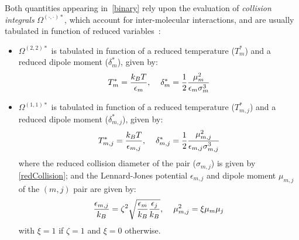 Both quantities appearing in~\ref{binary} rely upon the evaluation of \emph{collision integrals} $\Omega^{(\cdot,\cdot)*}$, which account for inter-molecular interactions, and are usually tabulated in function of reduced variables~\cite{Monchick:1961}:
\begin{itemize}
\item $\Omega^{(2,2)*}$ is tabulated in function of a reduced temperature ($T^*_m $) and a reduced dipole moment ($\delta^*_m$), given by:
\begin{eqnarray*}
T^*_m = \frac{k_BT}{\epsilon_m},
\hspace{4mm}
\delta^*_m = \frac{1}{2} \frac{\mu^2_m}{\epsilon_m \sigma^3_m}
\end{eqnarray*}
\item $\Omega^{(1,1)*}$ is tabulated in function of a reduced temperature ($T^*_{m,j} $) and a reduced dipole moment ($\delta^*_{m,j}$), given by:
\begin{eqnarray*}
T^*_{m,j} = \frac{k_BT}{\epsilon_{m,j}},
\hspace{4mm}
\delta^*_{m,j} = \frac{1}{2} \frac{\mu^2_{m,j}}{\epsilon_{m,j} \sigma^3_{m,j}}
\end{eqnarray*}
where the reduced collision diameter of the pair ($\sigma_{m,j}$) is given by \ref{redCollision}; and the Lennard-Jones potential $\epsilon_{m,j}$ and dipole moment $\mu_{m,j}$ of the $(m,j)$ pair are given by:
\begin{eqnarray*}
\frac{\epsilon_{m,j}}{k_B} = \zeta^2 \sqrt{\frac{\epsilon_m}{k_B} \frac{\epsilon_j}{k_B}},
\hspace{4mm}
\mu^2_{m,j} = \xi \mu_m \mu_j 
\end{eqnarray*}
with $\xi = 1$ if $\zeta = 1$ and $\xi = 0$ otherwise.
\end{itemize}

